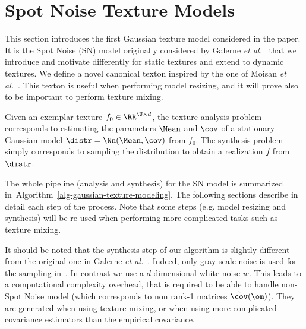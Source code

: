 
\section{Spot Noise Texture Models}
\label{sec-sn}

This section introduces the first Gaussian texture model considered in the paper. It is the Spot Noise (SN) model originally considered by Galerne \emph{et al.}~\cite{Galerne2011} that we introduce and motivate differently for static textures and extend to dynamic textures. We define a novel canonical texton inspired by the one of Moisan \emph{et al.}~\cite{}. This texton is useful when performing model resizing, and it will prove also to be important to perform texture mixing. 

Given an exemplar texture $f_0 \in \RR^{\U \times d}$, the texture analysis problem corresponds to estimating the  parameters $\Mean$ and $\cov$ of a stationary Gaussian model $\distr = \Nn(\Mean, \cov)$ from $f_0$. The synthesis problem simply corresponds to sampling the distribution to obtain a realization $f$ from $\distr$.

The whole pipeline (analysis and synthesis) for the SN model is summarized in~Algorithm~\ref{alg-gaussian-texture-modeling}. The following sections describe in detail each step of the process. Note that some steps (e.g. model resizing and synthesis) will be re-used when performing more complicated tasks such as texture mixing.

It should be noted that the synthesis step of our algorithm is slightly different from the original one in Galerne \emph{et al.}~\cite{Galerne2011}. Indeed, only gray-scale noise is used for the sampling in~\cite{Galerne2011}. In contrast we use a $d$-dimensional white noise $w$. This leads to a computational complexity overhead, that is required to be able to handle non-Spot Noise model (which corresponds to non rank-1 matrices $\hat\cov(\om)$). They are generated when using texture mixing, or when using more complicated covariance estimators than the empirical covariance.



